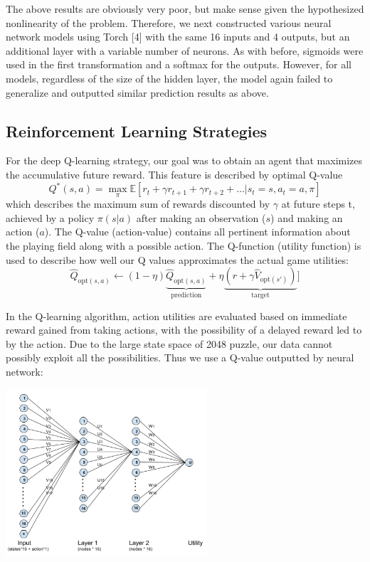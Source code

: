\documentclass[9pt,twocolumn]{article}
\begin{document}
The above results are obviously very poor, but make sense given the hypothesized nonlinearity of the problem. Therefore, we next constructed various neural network models using Torch [4] with the same 16 inputs and 4 outputs, but an additional layer with a variable number of neurons. As with before, sigmoids were used in the first transformation and a softmax for the outputs. However, for all models, regardless of the size of the hidden layer, the model again failed to generalize and outputted similar prediction results as above.

\subsection{Reinforcement Learning Strategies}

For the deep Q-learning strategy, our goal was to obtain an agent that maximizes the accumulative future reward. This feature is described by optimal Q-value $$Q^*(s, a) = \max_{\pi} \mathbb{E} [r_t + \gamma r_{t + 1} + \gamma r_{t + 2} + \dots | s_t = s, a_t = a, \pi]$$ which describes the maximum sum of rewards discounted by $\gamma$ at future steps t, achieved by a policy $\pi(s|a)$ after making an observation ($s$) and making an action ($a$). The Q-value (action-value) contains all pertinent information about the playing field along with a possible action. The Q-function (utility function) is used to describe how well our Q values approximates the actual game utilities: $$\hat Q_{\text{opt}(s, a)} \leftarrow (1-\eta) \underbrace{\hat Q_{\text{opt}(s, a)}}_\text{prediction} + \eta \underbrace{(r + \gamma \hat V_{\text{opt}(s')})}_\text{target}]$$

In the Q-learning algorithm, action utilities are evaluated based on immediate reward gained from taking actions, with the possibility of a delayed reward led to by the action. Due to the large state space of 2048 puzzle, our data cannot possibly exploit all the possibilities. Thus we use a Q-value outputted by neural network:

\begin{centering}

\includegraphics[width=75mm]{rl_nodes.png}

\end{centering}
\end{document}
